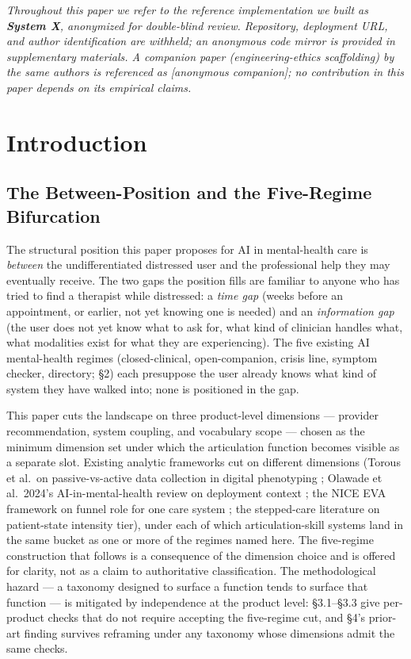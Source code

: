 \documentclass[letterpaper]{article}
\begin{document}
\noindent\textit{Throughout this paper we refer to the reference implementation we built as \textbf{System X}, anonymized for double-blind review. Repository, deployment URL, and author identification are withheld; an anonymous code mirror is provided in supplementary materials. A companion paper (engineering-ethics scaffolding) by the same authors is referenced as [anonymous companion]; no contribution in this paper depends on its empirical claims.}

\section{Introduction}

\subsection{The Between-Position and the Five-Regime Bifurcation}

The structural position this paper proposes for AI in mental-health care is \emph{between} the undifferentiated distressed user and the professional help they may eventually receive. The two gaps the position fills are familiar to anyone who has tried to find a therapist while distressed: a \emph{time gap} (weeks before an appointment, or earlier, not yet knowing one is needed) and an \emph{information gap} (the user does not yet know what to ask for, what kind of clinician handles what, what modalities exist for what they are experiencing). The five existing AI mental-health regimes (closed-clinical, open-companion, crisis line, symptom checker, directory; \S2) each presuppose the user already knows what kind of system they have walked into; none is positioned in the gap.

This paper cuts the landscape on three product-level dimensions --- provider recommendation, system coupling, and vocabulary scope --- chosen as the minimum dimension set under which the articulation function becomes visible as a separate slot. Existing analytic frameworks cut on different dimensions (Torous et al.~on passive-vs-active data collection in digital phenotyping \citep{torous2018digital}; Olawade et al.~2024's AI-in-mental-health review on deployment context \citep{olawade2024review}; the NICE EVA framework on funnel role for one care system \citep{nice2024htg756}; the stepped-care literature on patient-state intensity tier), under each of which articulation-skill systems land in the same bucket as one or more of the regimes named here. The five-regime construction that follows is a consequence of the dimension choice and is offered for clarity, not as a claim to authoritative classification. The methodological hazard --- a taxonomy designed to surface a function tends to surface that function --- is mitigated by independence at the product level: \S3.1--\S3.3 give per-product checks that do not require accepting the five-regime cut, and \S4's prior-art finding survives reframing under any taxonomy whose dimensions admit the same checks.
\end{document}
